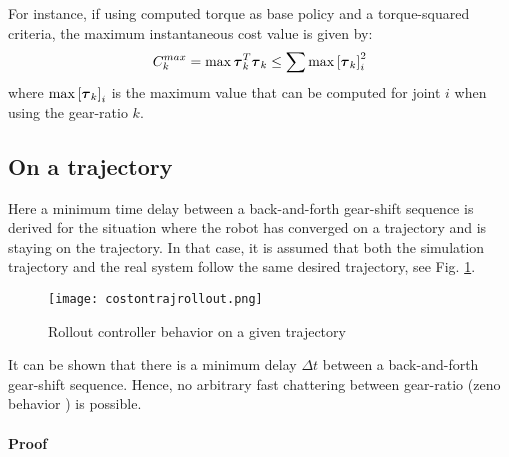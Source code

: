 For instance, if using computed torque as base policy and a torque-squared criteria, the maximum instantaneous cost value is given by:
%
\begin{align}
C_k^{max} =  \operatornamewithlimits{max} \vec{\tau}_k^T \vec{\tau}_k \leq \sum \operatornamewithlimits{max} \left[\vec{\tau}_{k}\right]_{i}^2 
\end{align}
%
where $\operatornamewithlimits{max} \left[\vec{\tau}_{k}\right]_{i}$ is the maximum value that can be computed for joint $i$ when using the gear-ratio $k$.

\subsection{On a trajectory}
\label{sec:chat1}

Here a minimum time delay between a back-and-forth gear-shift sequence is derived for the situation where the robot has converged on a trajectory and is staying on the trajectory. In that case, it is assumed that both the simulation trajectory and the real system follow the same desired trajectory, see Fig. \ref{fig:costontrajrollout}.

\begin{figure}[H]
	\centering
		\texttt{[image: costontrajrollout.png]}
	\caption{Rollout controller behavior on a given trajectory}
	\label{fig:costontrajrollout}
\end{figure}

It can be shown that there is a minimum delay $\Delta t$ between a back-and-forth gear-shift sequence. Hence, no arbitrary fast chattering between gear-ratio (zeno behavior \cite{liberzon_switching_2003}) is possible. 

\paragraph{Proof} 

